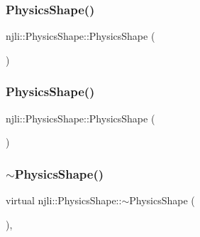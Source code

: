 \subsubsection{\texorpdfstring{Physics\+Shape()}{PhysicsShape()}\hspace{0.1cm}{\footnotesize\ttfamily [2/3]}}
{\footnotesize\ttfamily njli\+::\+Physics\+Shape\+::\+Physics\+Shape (\begin{DoxyParamCaption}\item[{const \mbox{\hyperlink{classnjli_1_1_abstract_builder}{Abstract\+Builder}} \&}]{ }\end{DoxyParamCaption})\hspace{0.3cm}{\ttfamily [protected]}}

\mbox{\label{classnjli_1_1_physics_shape_a16a9abace510dc1886f82c09782d2976}} 
\subsubsection{\texorpdfstring{Physics\+Shape()}{PhysicsShape()}\hspace{0.1cm}{\footnotesize\ttfamily [3/3]}}
{\footnotesize\ttfamily njli\+::\+Physics\+Shape\+::\+Physics\+Shape (\begin{DoxyParamCaption}\item[{const \mbox{\hyperlink{classnjli_1_1_physics_shape}{Physics\+Shape}} \&}]{ }\end{DoxyParamCaption})\hspace{0.3cm}{\ttfamily [protected]}}

\mbox{\label{classnjli_1_1_physics_shape_a4bd97d3b6ff4c10b082cc228aec318b1}} 
\subsubsection{\texorpdfstring{$\sim$\+Physics\+Shape()}{~PhysicsShape()}}
{\footnotesize\ttfamily virtual njli\+::\+Physics\+Shape\+::$\sim$\+Physics\+Shape (\begin{DoxyParamCaption}{ }\end{DoxyParamCaption})\hspace{0.3cm}{\ttfamily [protected]}, {\ttfamily [virtual]}}




